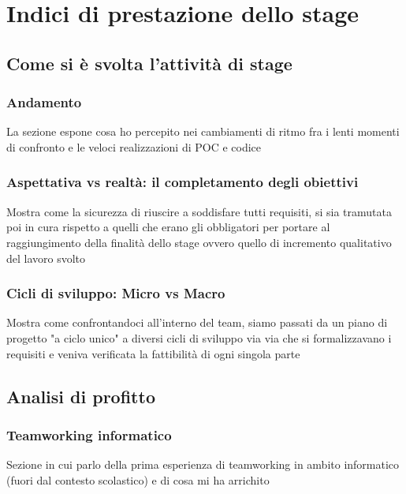 
\chapter{Indici di prestazione dello stage}
\label{cap:performance-stage}

\section{Come si è svolta l'attività di stage}
\subsection{Andamento}
La sezione espone cosa ho percepito nei cambiamenti di ritmo fra i lenti momenti di confronto e le veloci realizzazioni di POC e codice
\subsection{Aspettativa vs realtà: il completamento degli obiettivi}
Mostra come la sicurezza di riuscire a soddisfare tutti requisiti, si sia tramutata poi in cura rispetto a quelli che erano gli obbligatori per portare al raggiungimento della finalità dello stage ovvero quello di incremento qualitativo del lavoro svolto
\subsection{Cicli di sviluppo: Micro vs Macro}
Mostra come confrontandoci all'interno del team, siamo passati da un piano di progetto "a ciclo unico" a diversi cicli di sviluppo via via che si formalizzavano i requisiti e veniva verificata la fattibilità di ogni singola parte

\section{Analisi di profitto}
\subsection{Teamworking informatico}
Sezione in cui parlo della prima esperienza di teamworking in ambito informatico (fuori dal contesto scolastico) e di cosa mi ha arrichito
